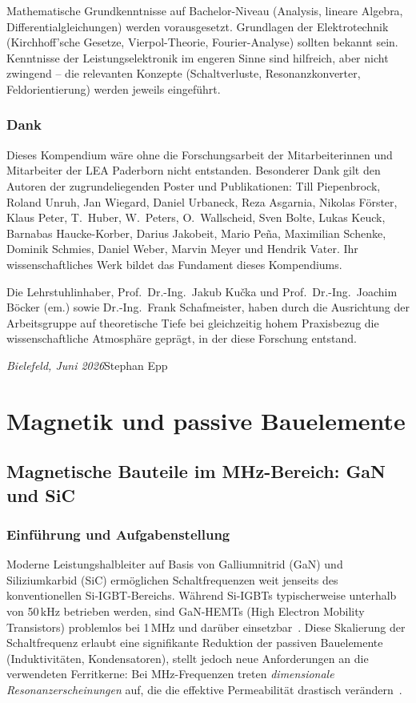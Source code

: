 ﻿\documentclass[a4paper,12pt,openany,oneside]{book}
\newcommand{\abschnitt}[1]{\section{#1}}
\theoremstyle{definition}
\begin{document}
Mathematische Grundkenntnisse auf Bachelor-Niveau (Analysis, lineare Algebra,
Differentialgleichungen) werden vorausgesetzt. Grundlagen der Elektrotechnik
(Kirchhoff'sche Gesetze, Vierpol-Theorie, Fourier-Analyse) sollten bekannt sein.
Kenntnisse der Leistungselektronik im engeren Sinne sind hilfreich, aber nicht
zwingend -- die relevanten Konzepte (Schaltverluste, Resonanzkonverter, Feldorientierung)
werden jeweils eingeführt.

\abschnitt{Dank}

Dieses Kompendium w\"are ohne die Forschungsarbeit der Mitarbeiterinnen und Mitarbeiter
der LEA Paderborn nicht entstanden. Besonderer Dank gilt den Autoren der zugrundeliegenden
Poster und Publikationen: Till Piepenbrock, Roland Unruh, Jan Wiegard, Daniel Urbaneck,
Reza Asgarnia, Nikolas F\"orster, Klaus Peter, T.~Huber, W.~Peters, O.~Wallscheid,
Sven Bolte, Lukas Keuck, Barnabas Haucke-Korber, Darius Jakobeit, Mario Pe\~na,
Maximilian Schenke, Dominik Schmies, Daniel Weber, Marvin Meyer und Hendrik Vater.
Ihr wissenschaftliches Werk bildet das Fundament dieses Kompendiums.

Die Lehrstuhlinhaber, Prof.\ Dr.-Ing.\ Jakub Ku\v{c}ka und Prof.\ Dr.-Ing.\ Joachim
B\"ocker (em.) sowie Dr.-Ing.\ Frank Schafmeister, haben durch die Ausrichtung der
Arbeitsgruppe auf theoretische Tiefe bei gleichzeitig hohem Praxisbezug die
wissenschaftliche Atmosph\"are gepr\"agt, in der diese Forschung entstand.

\medskip\noindent
\textit{Bielefeld, Juni 2026}\hfill Stephan Epp


\part{Magnetik und passive Bauelemente}

\chapter{Magnetische Bauteile im MHz-Bereich: GaN und SiC}
\label{kap:mhz_magnetik}

\abschnitt{Einf\"uhrung und Aufgabenstellung}

Moderne Leistungshalbleiter auf Basis von Galliumnitrid (GaN) und Siliziumkarbid (SiC) erm\"oglichen
Schaltfrequenzen weit jenseits des konventionellen Si-IGBT-Bereichs. W\"ahrend Si-IGBTs
typischerweise unterhalb von 50\,kHz betrieben werden, sind GaN-HEMTs (High Electron Mobility
Transistors) problemlos bei 1\,MHz und dar\"uber einsetzbar~\cite{jones2020gan}. Diese
Skalierung der Schaltfrequenz erlaubt eine signifikante Reduktion der passiven Bauelemente
(Induktivit\"aten, Kondensatoren), stellt jedoch neue Anforderungen an die verwendeten
Ferritkerne: Bei MHz-Frequenzen treten \emph{dimensionale Resonanzerscheinungen} auf,
die die effektive Permeabilit\"at drastisch ver\"andern~\cite{Dixon2001, Muhlethaler2012}.
\end{document}
